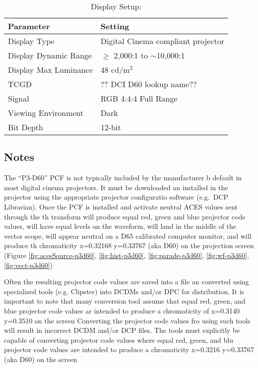 \begin{table}[ht!]
    \centering
        \begin{tabular}{|p{1.5in}|p{3in}|}
            \hline
            \textbf{Parameter} 		& 	\textbf{Setting} 				 		\\ \hline
            Display Type 			&	Digital Cinema compliant projector 		\\ \hline
            Display Dynamic Range 	& 	$\geq$ 2,000:1 to $\sim$10,000:1 		\\ \hline
            Display Max Luminance 	& 	48 cd/m$^2$								\\ \hline
            TCGD 					& 	?? DCI D60 lookup name?? 				\\ \hline %
            Signal 					&	RGB 4:4:4 Full Range					\\ \hline
            Viewing Environment 	& 	Dark 									\\ \hline
            Bit Depth 				& 	12-bit 									\\ \hline 
    	\end{tabular}
    \caption{Display Setup: \shortName{}} 
    \label{tab:setup-\id}
\end{table}

\subsection{Notes}
\label{subsec:notes-\id}

The ``P3-D60'' PCF is not typically included by the manufacturer b default in most digital cinema projectors. It must be downloaded an installed in the projector using the appropriate projector configuratio software (e.g.~DCP Librarian). Once the PCF is installed and activate neutral ACES values sent through the th \transformID{} transform will produce equal red, green and blue projector code values, will have equal levels on the waveform, will land in the middle of the vector scope, will appear neutral on a D65 calibrated computer monitor, and will produce th chromaticity x=0.32168 y=0.33767 (aka D60) on the projection screen (Figure \ref{fig:acesSource-p3d60}, \ref{fig:hist-p3d60}, \ref{fig:parade-p3d60}, \ref{fig:wf-p3d60}, \ref{fig:vect-p3d60})

Often the resulting projector code values are saved into a file an converted using specialized tools (e.g. Clipster) into DCDMs and/or  DPC for distribution. It is important to note that many conversion tool assume that equal red, green, and blue projector code values ar intended to produce a chromaticity of x=0.3140 y=0.3510 on the screen Converting the projector code values fro \transformID{} using such tools will result in incorrect DCDM and/or DCP files. The tools must explicitly be capable of converting projector code values where equal red, green, and blu projector code values are intended to produce a chromaticity x=0.3216 y=0.33767 (aka D60) on the screen 

